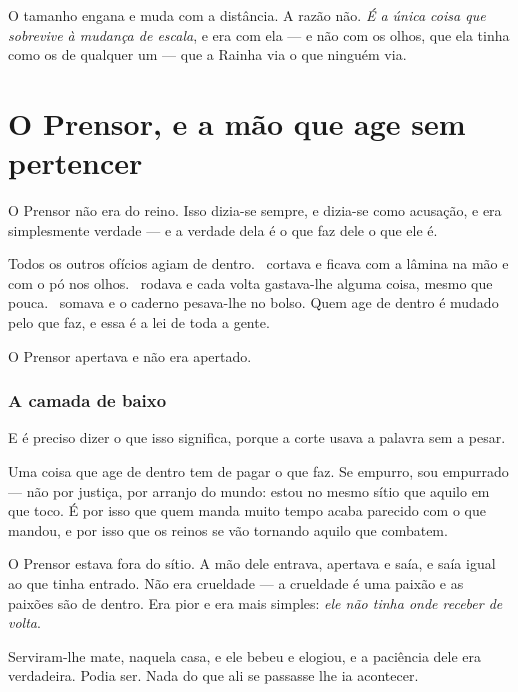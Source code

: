 \documentclass[livro.tex]{subfiles}
\begin{document}
O tamanho engana e muda com a distância. A razão não. \emph{É a única coisa que sobrevive à
mudança de escala}, e era com ela --- e não com os olhos, que ela tinha como os de qualquer um ---
que a Rainha via o que ninguém via.



\chapter{O Prensor, e a mão que age sem pertencer}

O Prensor não era do reino. Isso dizia-se sempre, e dizia-se como acusação, e era simplesmente
verdade --- e a verdade dela é o que faz dele o que ele é.

\medskip

Todos os outros ofícios agiam de dentro. \Drk\ cortava e ficava com a lâmina na mão e com o pó nos
olhos. \Ben\ rodava e cada volta gastava-lhe alguma coisa, mesmo que pouca. \Joa\ somava e o
caderno pesava-lhe no bolso. Quem age de dentro é mudado pelo que faz, e essa é a lei de toda a
gente.

\medskip

O Prensor apertava e não era apertado.

\subsection*{A camada de baixo}

E é preciso dizer o que isso significa, porque a corte usava a palavra sem a pesar.

\medskip

Uma coisa que age de dentro tem de pagar o que faz. Se empurro, sou empurrado --- não por justiça,
por arranjo do mundo: estou no mesmo sítio que aquilo em que toco. É por isso que quem manda muito
tempo acaba parecido com o que mandou, e por isso que os reinos se vão tornando aquilo que combatem.

\medskip

O Prensor estava fora do sítio. A mão dele entrava, apertava e saía, e saía igual ao que tinha
entrado. Não era crueldade --- a crueldade é uma paixão e as paixões são de dentro. Era pior e era
mais simples: \emph{ele não tinha onde receber de volta}.

\medskip

Serviram-lhe mate, naquela casa, e ele bebeu e elogiou, e a paciência dele era verdadeira. Podia
ser. Nada do que ali se passasse lhe ia acontecer.
\end{document}
